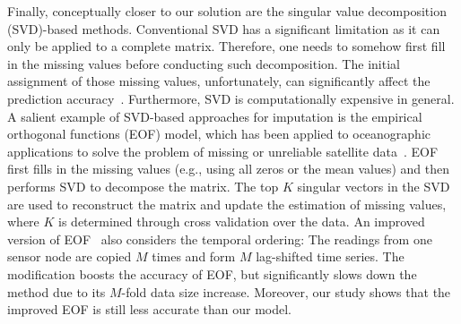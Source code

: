 Finally, conceptually closer to our solution are the singular value decomposition (SVD)-based methods.  
Conventional SVD has a significant
limitation as it can only be applied to a complete matrix.  Therefore,
one needs to somehow first fill in the missing values before
conducting such decomposition.  The initial assignment of those
missing values, unfortunately, can significantly affect the prediction
accuracy~\cite{koren2009matrix}.  Furthermore, SVD is computationally
expensive in general.  
A salient example of SVD-based approaches for imputation is the empirical orthogonal functions
(EOF) model, which has been applied to oceanographic applications to
solve the problem of missing or unreliable satellite
data~\cite{beckers2003eof}.  EOF first fills in the missing values
(e.g., using all zeros or the mean values) and then performs SVD 
to decompose the matrix. The top $K$ singular vectors in the SVD are used 
to reconstruct the matrix and update the estimation of missing values, 
where $K$ is determined through cross validation over the data.
An improved version of EOF~\cite{kondrashov2006spatio} also 
considers the temporal ordering:
The readings from one sensor node are copied $M$ times and form $M$ lag-shifted time series.
The modification boosts the accuracy of EOF, but significantly slows down the method
due to its $M$-fold data size increase.
Moreover, our study shows that the improved EOF is still less accurate than our model.




